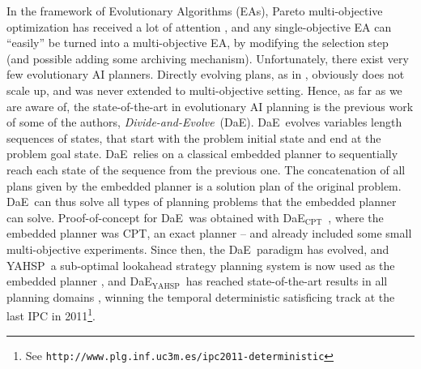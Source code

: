 \documentclass{llncs}
\def\dae{{\em Divide-and-Evolve}}
\def\DAE{{\sc DaE}}
\newcommand{\DAEYAHSP}{{\sc DaE$_{\text{YAHSP}}$}}
\newcommand{\DAECPT}{{\sc DaE$_{\text{CPT}}$}}
\def\YAHSP{{\sc YAHSP}}
\def\CPT{{\sc CPT}}
\begin{document}
In the framework of Evolutionary Algorithms (EAs), Pareto multi-objective optimization has received a lot of attention \cite{Deb-book}, and any single-objective EA can ``easily'' be turned into a multi-objective EA, by modifying the selection step (and possible adding some archiving mechanism). Unfortunately, there exist very few evolutionary AI planners. Directly evolving plans, as in \cite{Morignot-2005}, obviously does not scale up, and was never extended to multi-objective setting. Hence, as far as we are aware of, the state-of-the-art in evolutionary AI planning is the previous work of some of the authors, \dae\ (\DAE). \DAE\ evolves variables length sequences of states, that start with the problem initial state and end at the problem goal state. \DAE\ relies on a classical embedded planner to sequentially reach each state of the sequence from the previous one. The concatenation of all plans given by the embedded planner is a solution plan of the original problem. \DAE\ can thus solve all types of 
planning problems that the embedded planner can solve. Proof-of-concept for \DAE\ was obtained with \DAECPT\ \cite{evoCOP2006}, where the embedded planner was \CPT, an exact planner \cite{vidal:aaai04} -- and already included some small multi-objective experiments. Since then, the \DAE\ paradigm has evolved, and \YAHSP\, a sub-optimal lookahead strategy planning system \cite{Vidal2004} is now used as the embedded planner \cite{bibai-EvoCOP2010}, and \DAEYAHSP\ has reached state-of-the-art results in all planning domains \cite{Bibai2010}, winning the temporal deterministic satisficing track at the last IPC in 2011\footnote{See {\tt http://www.plg.inf.uc3m.es/ipc2011-deterministic}}. 
\end{document}
